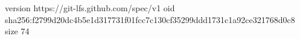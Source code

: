 version https://git-lfs.github.com/spec/v1
oid sha256:f2799d20dc4b5e1d317731f01fcc7c130cf35299ddd1731c1a92ce321768d0c8
size 74
